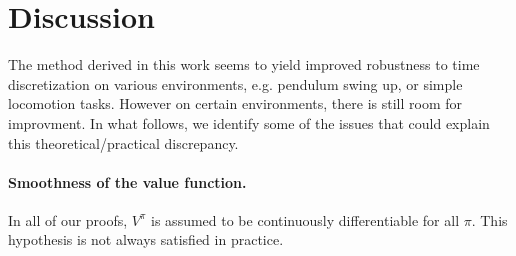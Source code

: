 \section{Discussion}
\label{sec:discussions}

The method derived in this work seems to yield improved robustness to
time discretization on various environments, e.g. pendulum swing up, or
simple locomotion tasks.  However on certain environments, there is still
room for improvment. In what follows, we identify some of the issues
that could explain this theoretical/practical discrepancy.

\paragraph{Smoothness of the value function.} In all of our proofs, $V^\pi$ is
assumed to be continuously differentiable for all $\pi$.  This %
hypothesis is not always satisfied in practice. 

